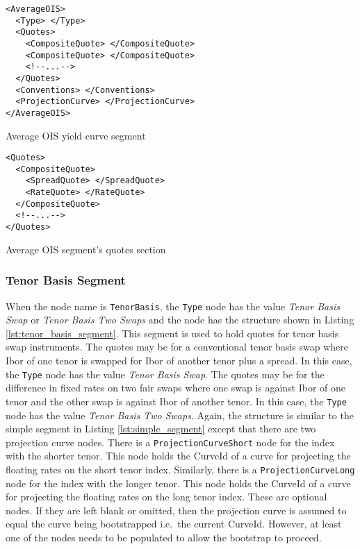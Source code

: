 \begin{listing}[H]
\begin{verbatim}
<AverageOIS>
  <Type> </Type>
  <Quotes>
    <CompositeQuote> </CompositeQuote>
    <CompositeQuote> </CompositeQuote>
    <!--...-->
  </Quotes>
  <Conventions> </Conventions>
  <ProjectionCurve> </ProjectionCurve>
</AverageOIS>
\end{verbatim}
\caption{Average OIS yield curve segment}
\label{lst:average_ois_segment}
\end{listing}

\begin{listing}[H]
\begin{verbatim}
<Quotes>
  <CompositeQuote>
    <SpreadQuote> </SpreadQuote>
    <RateQuote> </RateQuote>
  </CompositeQuote>
  <!--...-->
</Quotes>
\end{verbatim}
\caption{Average OIS segment's quotes section}
\label{lst:average_ois_quotes}
\end{listing}

\subsubsection*{Tenor Basis Segment}
When the node name is \lstinline!TenorBasis!, the \lstinline!Type! node has the value \emph{Tenor Basis Swap} or 
\emph{Tenor Basis Two Swaps} and the node has the structure shown in Listing \ref{lst:tenor_basis_segment}. This segment 
is used to hold quotes for tenor basis swap instruments. The quotes may be for a conventional tenor basis swap where Ibor 
of one tenor is swapped for Ibor of another tenor plus a spread. In this case, the \lstinline!Type! node has the value 
\emph{Tenor Basis Swap}. The quotes may be for the difference in fixed rates on two fair swaps where one swap is against 
Ibor of one tenor and the other swap is against Ibor of another tenor. In this case, the \lstinline!Type! node has the 
value \emph{Tenor Basis Two Swaps}. Again, the structure is similar to the simple segment in Listing 
\ref{lst:simple_segment} except that there are two projection curve nodes. There is a \lstinline!ProjectionCurveShort! 
node for the index with the shorter tenor. This node holds the CurveId of a curve for projecting the floating rates on the 
short tenor index. Similarly, there is a \lstinline!ProjectionCurveLong! node for the index with the longer tenor. This 
node holds the CurveId of a curve for projecting the floating rates on the long tenor index. These are optional nodes. If 
they are left blank or omitted, then the projection curve is assumed to equal the curve being bootstrapped i.e.\ the 
current CurveId. However, at least one of the nodes needs to be populated to allow the bootstrap to proceed.

